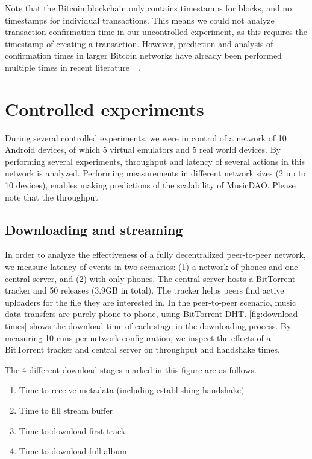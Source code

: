 Note that the Bitcoin blockchain only contains timestamps for blocks, and no timestamps for individual transactions. This means we could not analyze transaction confirmation time in our uncontrolled experiment, as this requires the timestamp of creating a transaction. However, prediction and analysis of confirmation times in larger Bitcoin networks have already been performed multiple times in recent literature~\citep{kawase2017transaction}~\citep{koops2018predicting}.

\section{Controlled experiments}
During several controlled experiments, we were in control of a network of 10 Android devices, of which 5 virtual emulators and 5 real world devices. By performing several experiments, throughput and latency of several actions in this network is analyzed. Performing measurements in different network sizes (2 up to 10 devices), enables making predictions of the scalability of MusicDAO. Please note that the throughput 

\subsection{Downloading and streaming}
In order to analyze the effectiveness of a fully decentralized peer-to-peer network, we measure latency of events in two scenarios: (1) a network of phones and one central server, and (2) with only phones. The central server hosts a BitTorrent tracker and 50 releases (3.9GB in total). The tracker helps peers find active uploaders for the file they are interested in. In the peer-to-peer scenario, music data transfers are purely phone-to-phone, using BitTorrent DHT. \ref{fig:download-times} shows the download time of each stage in the downloading process. By measuring 10 runs per network configuration, we inspect the effects of a BitTorrent tracker and central server on throughput and handshake times.

The 4 different download stages marked in this figure are as follows.

\begin{enumerate}
    \item Time to receive metadata (including establishing handshake)
    \item Time to fill stream buffer
    \item Time to download first track
    \item Time to download full album
\end{enumerate}

